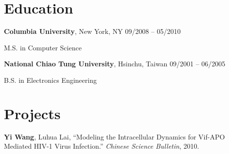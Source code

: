 \documentclass[margin,line]{resume}
\begin{document}
\begin{resume}
    \section{\mysidestyle Education}

    \textbf{Columbia University}, New York, NY \hfill 09/2008 -- 05/2010 \vspace{-3mm}\\\vspace{-1mm}%
      \begin{list2}
       \item M.S. in Computer Science
      \end{list2}
 
    \textbf{National Chiao Tung University}, Hsinchu, Taiwan \hfill 09/2001 -- 06/2005 \vspace{-3mm}\\\vspace{-1mm}%
      \begin{list2}
       \item B.S. in Electronics Engineering
      \end{list2}

    \section{\mysidestyle Projects}

      \textbf{Yi Wang}, Luhua Lai, ``Modeling the Intracellular Dynamics for Vif-APO Mediated HIV-1 Virus Infection.''
      \textsl{Chinese Science Bulletin}, 2010.

\end{resume}
\end{document}
